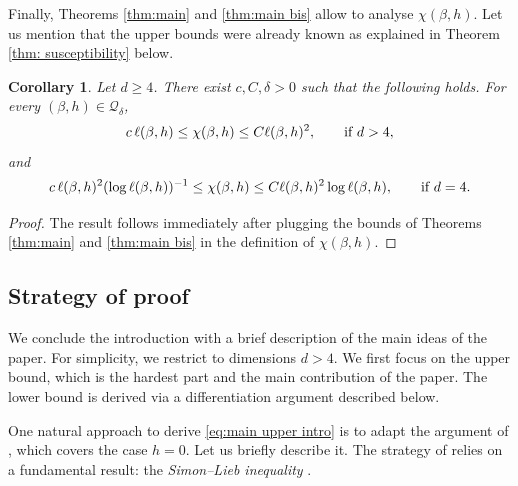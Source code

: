 \documentclass[11pt,a4paper]{article}
\numberwithin{equation}{section}
\theoremstyle{plain}
\newtheorem{Coro}[Thm]{Corollary}
\theoremstyle{definition}
\begin{document}
Finally, Theorems \ref{thm:main} and \ref{thm:main bis} allow to analyse $\chi(\beta,h)$. Let us mention that the upper bounds were already known as explained in Theorem \ref{thm: susceptibility} below.
\begin{Coro} Let $d\geq 4$. There exist $c,C,\delta>0$ such that the following holds. For every $(\beta,h)\in \mathcal Q_\delta$,
\begin{equation}
c\,\ell(\beta,h)\leq \chi(\beta,h)\leq C\ell(\beta,h)^2,\qquad \textup{if }d>4,
\end{equation}
and
\begin{equation}
c\,\ell(\beta,h)^2(\log \ell(\beta,h))^{-1}\leq \chi(\beta,h)\leq C\ell(\beta,h)^2\log \ell(\beta,h),\qquad \textup{if }d=4.
\end{equation}
\end{Coro}
\begin{proof} The result follows immediately after plugging the bounds of Theorems \ref{thm:main} and \ref{thm:main bis} in the definition of $\chi(\beta,h)$.
\end{proof}


\subsection{Strategy of proof}

We conclude the introduction with a brief description of the main ideas 
of the paper. For simplicity, we restrict to dimensions $d>4$. We first focus on the upper bound, which is the hardest part and the main 
contribution of the paper. The lower bound is derived via a 
differentiation argument described below.

\vspace{4pt}

One natural approach to derive \eqref{eq:main upper intro} is to adapt the argument of \cite{DuminilPanis2024newLB}, which covers the case $h=0$. Let us briefly describe it. The strategy of \cite{DuminilPanis2024newLB} relies on a fundamental result: the \emph{Simon--Lieb inequality} \cite{SimonInequalityIsing1980,LiebImprovementSimonInequality}.
\end{document}
